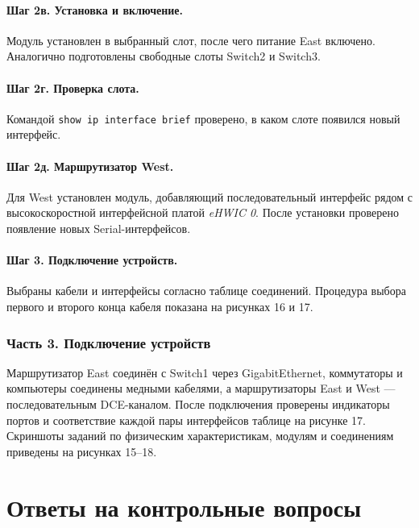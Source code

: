 \documentclass[a4paper,14pt,oneside]{extarticle}
\begin{document}
\paragraph{Шаг 2в. Установка и включение.}
Модуль установлен в выбранный слот, после чего питание East включено.
Аналогично подготовлены свободные слоты Switch2 и Switch3.

\paragraph{Шаг 2г. Проверка слота.}
Командой \texttt{show ip interface brief} проверено, в каком слоте
появился новый интерфейс.

\paragraph{Шаг 2д. Маршрутизатор West.}
Для West установлен модуль, добавляющий последовательный интерфейс рядом
с высокоскоростной интерфейсной платой \textit{eHWIC 0}. После установки
проверено появление новых Serial-интерфейсов.

\paragraph{Шаг 3. Подключение устройств.}
Выбраны кабели и интерфейсы согласно таблице соединений. Процедура выбора
первого и второго конца кабеля показана на рисунках 16 и 17.

\subsubsection{Часть 3. Подключение устройств}

Маршрутизатор East соединён с Switch1 через GigabitEthernet, коммутаторы и
компьютеры соединены медными кабелями, а маршрутизаторы East и West —
последовательным DCE-каналом. После подключения проверены индикаторы портов
и соответствие каждой пары интерфейсов таблице на рисунке 17. Скриншоты
заданий по физическим характеристикам, модулям и соединениям приведены на
рисунках 15--18.

\section{Ответы на контрольные вопросы}
\end{document}

